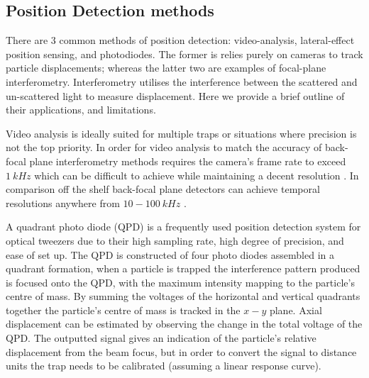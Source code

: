 \subsection{Position Detection methods}
There are 3 common methods of position detection: video-analysis, lateral-effect position sensing, and photodiodes. The former is 
relies purely on cameras to track particle displacements; whereas 
the latter two are examples of focal-plane interferometry. 
Interferometry utilises the interference between the scattered and un-scattered light to measure displacement. Here we 
provide a brief outline of their applications, and limitations. 

Video analysis is ideally suited for multiple traps or situations where 
precision is not the top priority. In order for video analysis to 
match the accuracy of back-focal plane interferometry methods requires 
the camera's frame rate to exceed $1\ kHz$ which can be difficult to 
achieve while maintaining a decent resolution \cite{Gibson2008}. In 
comparison off the shelf back-focal plane detectors can achieve temporal 
resolutions anywhere from $10-100\ kHz$ \cite{BergSoerensen2004}. 

A quadrant photo diode (QPD) is a frequently used position detection 
system for optical tweezers due to their high sampling rate, high 
degree of precision, and ease of set up. The QPD is constructed of 
four photo diodes assembled in a quadrant formation, when a particle 
is trapped the interference pattern produced is focused onto the QPD, 
with the maximum intensity mapping to the particle's centre of mass. 
By summing the voltages of the horizontal and vertical quadrants together 
the particle's centre of mass is tracked in the $x-y$ plane. Axial 
displacement can be estimated by observing the change in the total 
voltage of the QPD. The outputted signal gives an indication of the 
particle's relative displacement from the beam focus, but in order to 
convert the signal to distance units the trap needs to be calibrated 
(assuming a linear response curve).


